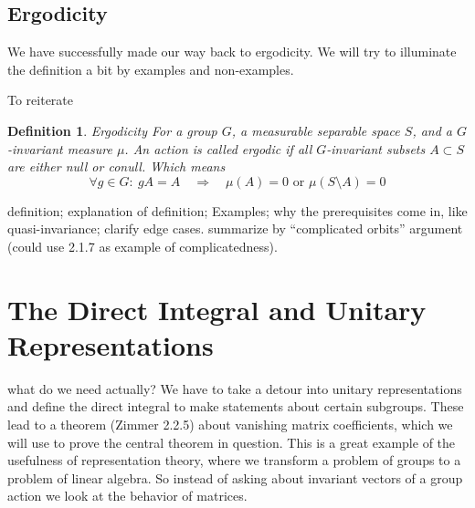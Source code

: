 \documentclass[
]{article}
\theoremstyle{break}
\newtheorem{defn}{Definition}
\theoremstyle{plain}
\begin{document}

\hypertarget{ergodicity}{%
\subsection{Ergodicity}\label{ergodicity}}

We have successfully made our way back to ergodicity. We will try to
illuminate the definition a bit by examples and non-examples.

To reiterate

\begin{defn}{Ergodicity}
For a group $G$, a measurable separable space $S$, and a $G$-invariant measure $\mu$. An action is called ergodic if all $G$-invariant subsets $A\subset S$ are either null or conull. Which means 
$$
\forall g\in G:\ gA = A \quad \Rightarrow \quad \mu(A)=0 \text{ or } \mu(S\setminus A)=0
$$
\end{defn}

definition; explanation of definition; Examples; why the prerequisites
come in, like quasi-invariance; clarify edge cases. summarize by
``complicated orbits'' argument (could use 2.1.7 as example of
complicatedness).






\hypertarget{the-direct-integral-and-unitary-representations}{%
\section{The Direct Integral and Unitary Representations}\label{the-direct-integral-and-unitary-representations}}

what do we need actually? We have to take a detour into unitary
representations and define the direct integral to make statements about
certain subgroups. These lead to a theorem (Zimmer 2.2.5) about
vanishing matrix coefficients, which we will use to prove the central
theorem in question. This is a great example of the usefulness of
representation theory, where we transform a problem of groups to a
problem of linear algebra. So instead of asking about invariant vectors
of a group action we look at the behavior of matrices.
\end{document}
